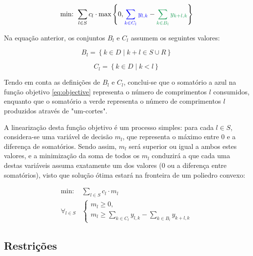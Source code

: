 \documentclass[12pt, a4paper, titlepage]{article}
\begin{document}
\begin{equation}
    \text{min: } \sum_{l \in S} c_l \cdot \max \left \{ 0,
        {\color{blue} \sum_{k \in C_l} y_{l,k}} -
        {\color{ForestGreen} \sum_{k \in B_l} y_{k + l, k}}
    \right \}
    \label{eq:objective}
\end{equation}

Na equação anterior, os conjuntos $B_l$ e $C_l$ assumem os seguintes valores:

\begin{equation}
    B_l = \left \{k \in D \mid k + l \in S \cup R \right \} \label{eq:Bl}
\end{equation}

\begin{equation}
    C_l = \left \{k \in D \mid k < l \right \} \label{eq:Cl}
\end{equation}

Tendo em conta as definições de $B_l$ e $C_l$, conclui-se que o somatório a {\color{blue} azul}
na função objetivo \eqref{eq:objective} representa o número de comprimentos $l$ consumidos, enquanto
que o somatório a {\color{ForestGreen} verde} representa o número de comprimentos $l$ produzidos
através de "um-cortes"{}.

A linearização desta função objetivo é um processo simples: para cada $l \in S$, considera-se uma
variável de decisão $m_l$, que representa o máximo entre $0$ e a diferença de somatórios. Sendo
assim, $m_l$ será superior ou igual a ambos estes valores, e a minimização da soma de todos os $m_l$
conduzirá a que cada uma destas variáveis assuma exatamente um dos valores ($0$ ou a diferença entre
somatórios), visto que solução ótima estará na fronteira de um poliedro convexo:

\begin{equation}
    \begin{split}
        \text{min: }      & \sum_{l \in S} c_l \cdot m_l \\
        \forall_{l \in S} & \begin{cases}
            m_l \geq 0, \\
            m_l \geq \sum_{k \in C_l} y_{l,k} - \sum_{k \in B_l} y_{k + l, k}
        \end{cases}
    \end{split}
    \label{eq:objective-expanded}
\end{equation}

\subsection{Restrições}
\end{document}
